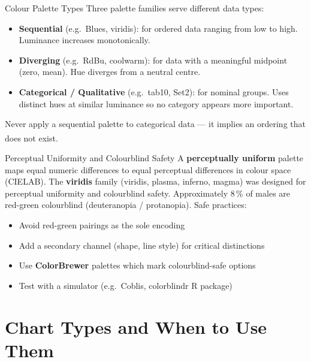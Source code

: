 \begin{v3topic}{Colour Palette Types}
    Three palette families serve different data types:
    \begin{itemize}
        \item \textbf{Sequential} (e.g.\ Blues, viridis): for ordered data ranging from low to
              high. Luminance increases monotonically.
        \item \textbf{Diverging} (e.g.\ RdBu, coolwarm): for data with a meaningful midpoint
              (zero, mean). Hue diverges from a neutral centre.
        \item \textbf{Categorical / Qualitative} (e.g.\ tab10, Set2): for nominal groups.
              Uses distinct hues at similar luminance so no category appears more important.
    \end{itemize}
    Never apply a sequential palette to categorical data --- it implies an ordering that
    does not exist\textsuperscript{\cite[][pp.~120--135]{jansenHandbuchInfografik1999}}.

\end{v3topic}
\begin{v3topic}{Perceptual Uniformity and Colourblind Safety}
    A \textbf{perceptually uniform} palette maps equal numeric differences to equal
    perceptual differences in colour space (CIELAB). The \textbf{viridis} family
    (viridis, plasma, inferno, magma) was designed for perceptual uniformity and
    colourblind safety. Approximately 8\,\% of males are red-green colourblind (deuteranopia /
    protanopia). Safe practices:
    \begin{itemize}
        \item Avoid red-green pairings as the sole encoding
        \item Add a secondary channel (shape, line style) for critical distinctions
        \item Use \textbf{ColorBrewer} palettes which mark colourblind-safe options
        \item Test with a simulator (e.g.\ Coblis, colorblindr R package)
    \end{itemize}
\end{v3topic}

\section{Chart Types and When to Use Them}

